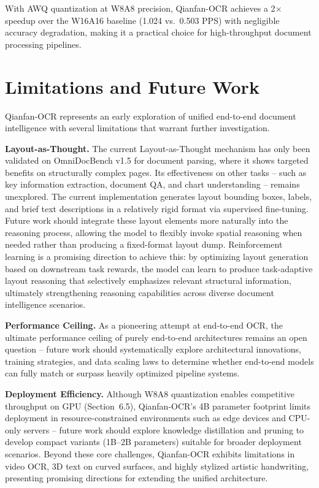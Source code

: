 \documentclass[dvipsnames]{article}
\begin{document}
With AWQ quantization at W8A8 precision, Qianfan-OCR achieves a 2$\times$ speedup over the W16A16 baseline (1.024 vs.\ 0.503 PPS) with negligible accuracy degradation, making it a practical choice for high-throughput document processing pipelines.

\section{Limitations and Future Work}

Qianfan-OCR represents an early exploration of unified end-to-end document intelligence with several limitations that warrant further investigation.

\textbf{Layout-as-Thought.} The current Layout-as-Thought mechanism has only been validated on OmniDocBench v1.5 for document parsing, where it shows targeted benefits on structurally complex pages. Its effectiveness on other tasks -- such as key information extraction, document QA, and chart understanding -- remains unexplored. The current implementation generates layout bounding boxes, labels, and brief text descriptions in a relatively rigid format via supervised fine-tuning. Future work should integrate these layout elements more naturally into the reasoning process, allowing the model to flexibly invoke spatial reasoning when needed rather than producing a fixed-format layout dump. Reinforcement learning is a promising direction to achieve this: by optimizing layout generation based on downstream task rewards, the model can learn to produce task-adaptive layout reasoning that selectively emphasizes relevant structural information, ultimately strengthening reasoning capabilities across diverse document intelligence scenarios.

\textbf{Performance Ceiling.} As a pioneering attempt at end-to-end OCR, the ultimate performance ceiling of purely end-to-end architectures remains an open question -- future work should systematically explore architectural innovations, training strategies, and data scaling laws to determine whether end-to-end models can fully match or surpass heavily optimized pipeline systems.

\textbf{Deployment Efficiency.} Although W8A8 quantization enables competitive throughput on GPU (Section~6.5), Qianfan-OCR's 4B parameter footprint limits deployment in resource-constrained environments such as edge devices and CPU-only servers -- future work should explore knowledge distillation and pruning to develop compact variants (1B--2B parameters) suitable for broader deployment scenarios. Beyond these core challenges, Qianfan-OCR exhibits limitations in video OCR, 3D text on curved surfaces, and highly stylized artistic handwriting, presenting promising directions for extending the unified architecture.
\end{document}
